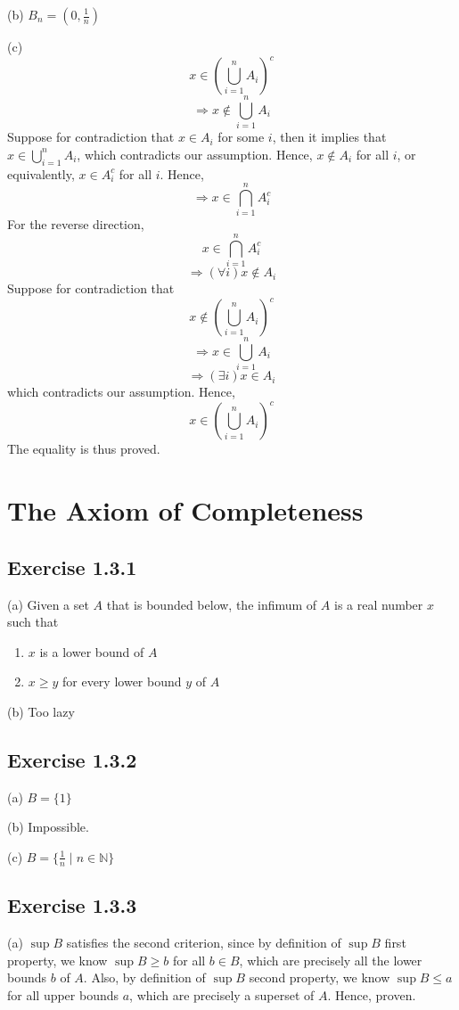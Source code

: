 \documentclass{book}
\begin{document}
\noindent
(b)
$B_n = (0, \frac{1}{n})$

\noindent
(c)
$$x \in \left( \bigcup_{i = 1}^n A_i \right)^c$$
$$\Rightarrow x \not \in \bigcup_{i = 1}^n A_i$$
Suppose for contradiction that $x \in A_i$ for some $i$, then it implies that $x \in \bigcup_{i = 1}^n A_i$, which contradicts our assumption. Hence, $x \not \in A_i$ for all $i$, or equivalently, $x \in A_i^c$ for all $i$. Hence,
$$\Rightarrow x \in \bigcap_{i = 1}^n A_i^c$$
For the reverse direction,
$$x \in \bigcap_{i = 1}^n A_i^c$$
$$\Rightarrow (\forall i) x \not \in A_i$$
Suppose for contradiction that
$$x \not \in \left( \bigcup_{i = 1}^n A_i \right)^c$$
$$\Rightarrow x \in \bigcup_{i = 1}^n A_i$$
$$\Rightarrow (\exists i) x \in A_i$$
which contradicts our assumption. Hence,
$$x \in \left( \bigcup_{i = 1}^n A_i \right)^c$$
The equality is thus proved.

\section{The Axiom of Completeness}

\subsection*{Exercise 1.3.1}
(a)
Given a set $A$ that is bounded below, the infimum of $A$ is a real number $x$ such that
\begin{enumerate}
    \item $x$ is a lower bound of $A$
    \item $x \geq y$ for every lower bound $y$ of $A$
\end{enumerate}

\noindent
(b)
Too lazy

\subsection*{Exercise 1.3.2}
(a)
$B = \{1\}$

\noindent
(b)
Impossible.

\noindent
(c)
$B = \{ \frac{1}{n} \mid n \in \mathbb{N} \}$

\subsection*{Exercise 1.3.3}
(a)
$\sup B$ satisfies the second criterion, since by definition of $\sup B$ first property, we know $\sup B \geq b$ for all $b \in B$, which are precisely all the lower bounds $b$ of $A$. Also, by definition of $\sup B$ second property, we know $\sup B \leq a$ for all upper bounds $a$, which are precisely a superset of $A$. Hence, proven.
\end{document}
